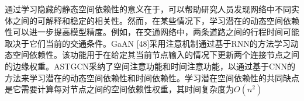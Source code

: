通过学习隐藏的静态空间依赖性的意义在于，可以帮助研究人员发现网络中不同实体之间的可解释和稳定的相关性。然而，在某些情况下，学习潜在的动态空间依赖性可以进一步提高模型精度。例如，在交通网络中，两条道路之间的行程时间可能取决于它们当前的交通条件。GaAN [48]采用注意机制通过基于RNN的方法学习动态空间依赖性。该功能用于在给定其当前节点输入的情况下更新两个连接节点之间的边缘权重。ASTGCN采纳了空间注意功能和时间注意功能，以通过基于CNN的方法来学习潜在的动态空间依赖性和时间依赖性。学习潜在空间依赖性的共同缺点是它需要计算每对节点之间的空间依赖性权重，其时间复杂度为$O(n^2)$





